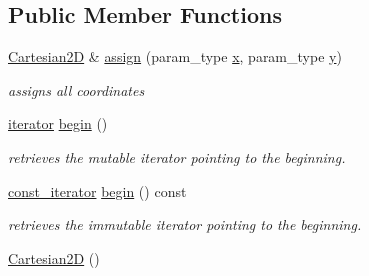 \subsection*{Public Member Functions}
\begin{DoxyCompactItemize}
\item 
\hypertarget{classhryky_1_1geometry_1_1coord_1_1_cartesian2_d_a52215e77be8d9e463c4394ffd8263a84}{\hyperlink{classhryky_1_1geometry_1_1coord_1_1_cartesian2_d}{Cartesian2\-D} \& \hyperlink{classhryky_1_1geometry_1_1coord_1_1_cartesian2_d_a52215e77be8d9e463c4394ffd8263a84}{assign} (param\-\_\-type \hyperlink{classhryky_1_1geometry_1_1coord_1_1_cartesian2_d_a43e730c23f9c35500ca23cdae59d2527}{x}, param\-\_\-type \hyperlink{classhryky_1_1geometry_1_1coord_1_1_cartesian2_d_a585367b45d11a14785e24edabdc459ea}{y})}\label{classhryky_1_1geometry_1_1coord_1_1_cartesian2_d_a52215e77be8d9e463c4394ffd8263a84}

\begin{DoxyCompactList}\small\item\em assigns all coordinates \end{DoxyCompactList}\item 
\hypertarget{classhryky_1_1_array_a12db8f567aa91dbbae25dca68db6e4d3}{\hyperlink{classhryky_1_1iterator_1_1random_1_1_mutable}{iterator} \hyperlink{classhryky_1_1_array_a12db8f567aa91dbbae25dca68db6e4d3}{begin} ()}\label{classhryky_1_1_array_a12db8f567aa91dbbae25dca68db6e4d3}

\begin{DoxyCompactList}\small\item\em retrieves the mutable iterator pointing to the beginning. \end{DoxyCompactList}\item 
\hypertarget{classhryky_1_1_array_a2e6fb08c9e286b0f33e17b98182a4cc7}{\hyperlink{classhryky_1_1iterator_1_1random_1_1_immutable}{const\-\_\-iterator} \hyperlink{classhryky_1_1_array_a2e6fb08c9e286b0f33e17b98182a4cc7}{begin} () const}\label{classhryky_1_1_array_a2e6fb08c9e286b0f33e17b98182a4cc7}

\begin{DoxyCompactList}\small\item\em retrieves the immutable iterator pointing to the beginning. \end{DoxyCompactList}\item 
\hypertarget{classhryky_1_1geometry_1_1coord_1_1_cartesian2_d_a3b8a12215b0448bcf2e5988bf81aa8c9}{\hyperlink{classhryky_1_1geometry_1_1coord_1_1_cartesian2_d_a3b8a12215b0448bcf2e5988bf81aa8c9}{Cartesian2\-D} ()}\label{classhryky_1_1geometry_1_1coord_1_1_cartesian2_d_a3b8a12215b0448bcf2e5988bf81aa8c9}


\end{DoxyCompactItemize}
